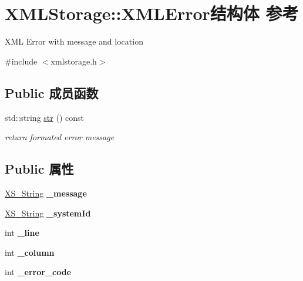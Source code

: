 \hypertarget{struct_x_m_l_storage_1_1_x_m_l_error}{}\section{X\+M\+L\+Storage\+:\+:X\+M\+L\+Error结构体 参考}
\label{struct_x_m_l_storage_1_1_x_m_l_error}


X\+ML Error with message and location  




{\ttfamily \#include $<$xmlstorage.\+h$>$}

\subsection*{Public 成员函数}
\begin{DoxyCompactItemize}
\item 
\mbox{\label{struct_x_m_l_storage_1_1_x_m_l_error_a38be2baf0527e8e7c236c20509bb05a0}} 
std\+::string \hyperlink{struct_x_m_l_storage_1_1_x_m_l_error_a38be2baf0527e8e7c236c20509bb05a0}{str} () const
\begin{DoxyCompactList}\small\item\em return formated error message \end{DoxyCompactList}\end{DoxyCompactItemize}
\subsection*{Public 属性}
\begin{DoxyCompactItemize}
\item 
\mbox{\label{struct_x_m_l_storage_1_1_x_m_l_error_af0f92a012c15c752a250a4e3f20cea06}} 
\hyperlink{struct_x_m_l_storage_1_1_x_s___string}{X\+S\+\_\+\+String} {\bfseries \+\_\+message}
\item 
\mbox{\label{struct_x_m_l_storage_1_1_x_m_l_error_a40979a102f5e3db74660d92e2b573c79}} 
\hyperlink{struct_x_m_l_storage_1_1_x_s___string}{X\+S\+\_\+\+String} {\bfseries \+\_\+system\+Id}
\item 
\mbox{\label{struct_x_m_l_storage_1_1_x_m_l_error_aa54276042c534e187592d1b22259c40d}} 
int {\bfseries \+\_\+line}
\item 
\mbox{\label{struct_x_m_l_storage_1_1_x_m_l_error_ad298102ebf43cfa05df4f437c0ffe2a6}} 
int {\bfseries \+\_\+column}
\item 
\mbox{\label{struct_x_m_l_storage_1_1_x_m_l_error_a9f8d6ba2c5442e8fa12a489a56e8bafa}} 
int {\bfseries \+\_\+error\+\_\+code}
\end{DoxyCompactItemize}
